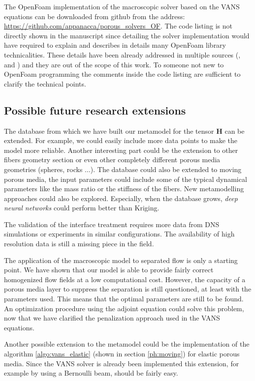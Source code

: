  The OpenFoam implementation of the macroscopic solver based on the VANS equations can be downloaded from github from the address: \url{https://github.com/appanacca/porous_solvers_OF}.
The code listing is not directly shown in the manuscript since detailing the solver implementation would have required to explain and describes in details many OpenFoam library 
technicalities. These details have been already addressed in multiple sources (\citet{jasak1996error}, \citet{moukalled2016finite} and 
\citet{maric2014openfoam}) and they are out of the scope of this work.
To someone not new to OpenFoam programming the comments inside the code listing are sufficient to clarify the technical points.




\subsection{Possible future research extensions}


 The database from which we have built our metamodel for the tensor $\mathbf{H}$ can be extended. For example, we could easily include more data points to make the model more reliable. Another interesting part could be the extension to other fibers geometry section or even other completely different porous media geometries (spheres, rocks ...). The database could also be extended to moving porous media, the input parameters could include some of the typical dynamical parameters like the mass ratio or the stiffness of the fibers. New metamodelling approaches could also be explored. Especially, when the database grows, \textit{deep neural networks} could perform better than Kriging.

 The validation of the interface treatment requires more data from DNS simulations or experiments in similar configurations. The availability of high resolution data is still a missing piece in the field.

 The application of the macroscopic model to separated flow is only a starting point. We have shown that our model is able to provide fairly correct homogenized flow fields at a low computational cost. However, the capacity of a porous media layer to suppress the separation is still questioned, at least with the parameters used. This means that the optimal parameters are still to be found. An optimization procedure using the adjoint equation could solve this problem, now that we have clarified the penalization approach used in the VANS equations.

 Another possible extension to the metamodel could be the implementation of the algorithm \ref{algo:vans_elastic} (shown in section \ref{ph:moving}) for elastic porous media. Since the VANS solver is already been implemented this extension, for example by using a Bernoulli beam, should be fairly easy.

